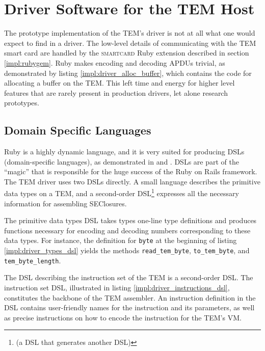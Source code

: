 \section{Driver Software for the TEM Host}\label{impl:driver}
The prototype implementation of the TEM's driver is not at all what one would
expect to find in a driver. The low-level details of communicating with the
TEM smart card are handled by the \textsc{smartcard} Ruby extension described
in section \ref{impl:rubygem}. Ruby makes encoding and decoding APDUs trivial,
as demonstrated by listing \ref{impl:driver_alloc_buffer}, which contains the
code for allocating a buffer on the TEM. This left time and energy for higher
level features that are rarely present in production drivers, let alone
research prototypes.



\subsection{Domain Specific Languages}
Ruby is a highly dynamic language, and it is very suited for producing DSLs
(domain-specific languages), as demonstrated in \cite{cuadrado2007bds} and
\cite{cunningham2007rmr}. DSLs are part of the ``magic'' that is responsible
for the huge success of the Ruby on Rails \cite{thomas2006awd} framework. The
TEM driver uses two DSLs directly. A small language describes the primitive
data types on a TEM, and a second-order DSL\footnote{(a DSL that generates
another DSL)} expresses all the necessary information for assembling SEClosures.

The primitive data types DSL takes types one-line type definitions and
produces functions necessary for encoding and decoding numbers corresponding to
these data types. For instance, the definition for \texttt{byte} at the
beginning of listing \ref{impl:driver_types_dsl} yields the methods
\texttt{read\_tem\_byte}, \texttt{to\_tem\_byte}, and
\texttt{tem\_byte\_length}.



The DSL describing the instruction set of the TEM is a second-order DSL. The
instruction set DSL, illustrated in listing \ref{impl:driver_instructions_dsl},
constitutes the backbone of the TEM assembler. An instruction definition in the
DSL contains user-friendly names for the instruction and its parameters, as
well as precise instructions on how to encode the instruction for the TEM's VM.

